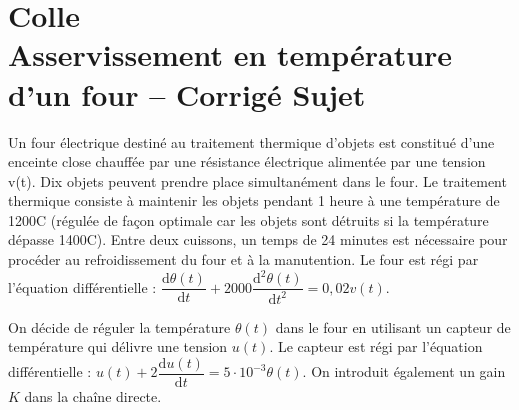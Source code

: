 \chapter*{Colle  \\ 
Asservissement en température d'un four -- 
\ifprof Corrigé \else Sujet \fi}

\iflivret {} \else
\ifprof  {} \else \fi
\fi

\setcounter{question}{0}







Un four électrique destiné au traitement thermique d'objets est constitué d'une enceinte close chauffée par une résistance électrique alimentée par une tension v(t). Dix objets peuvent prendre place simultanément dans le four. Le traitement thermique consiste à maintenir les objets pendant 1 heure à une température de 1200\degres C (régulée de façon optimale car les objets sont détruits si la température dépasse  1400\degres C).
Entre deux cuissons, un temps de 24 minutes est nécessaire pour procéder au refroidissement du four et à la manutention.
Le four est régi par l’équation différentielle : $\dfrac{\text{d}\theta(t)}{\text{d}t}+2000\dfrac{\text{d}^2\theta(t)}{\text{d}t^2}=0,02 v(t)$.



On décide de réguler la température $\theta(t)$ dans le four en utilisant un capteur de température qui délivre une tension $u(t)$. Le capteur est régi par l’équation différentielle :  $u(t)+2\dfrac{\text{d}u(t)}{\text{d}t}=5\cdot 10^{-3} \theta(t)$. On introduit également un gain $K$ dans la chaîne directe.


